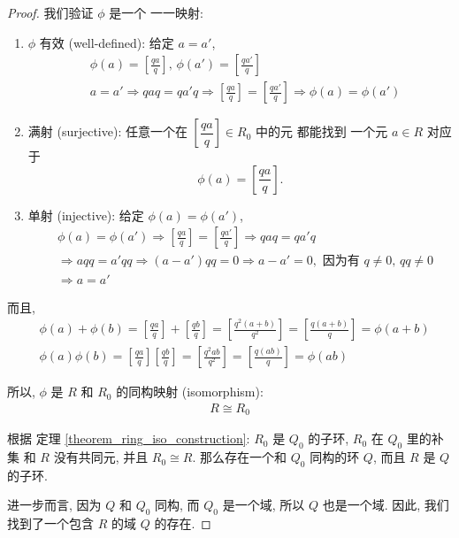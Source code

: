 \documentclass[utf8]{ctexbook}
\theoremstyle{definition}
\begin{document}
\begin{proof}
我们验证 $\phi$ 是一个 一一映射:
\begin{enumerate}
\item{$\phi$ 有效 (well-defined): 给定 $a = a'$,
\begin{align*}
& \phi(a) = \left[ \frac{q a}{q} \right], \, \phi(a') = \left[ \frac{q a'}{q} \right] \\
& a = a' \Longrightarrow q a q = q a' q \Longrightarrow \left[ \frac{q a}{q} \right] = \left[ \frac{q a'}{q} \right] \Longrightarrow \phi(a) = \phi(a')
\end{align*}
}
\item{满射 (surjective): 任意一个在 $\left[ \dfrac{q a}{q} \right] \in R_0$ 中的元 都能找到 一个元 $a \in R$ 对应于 
$$\phi(a) = \left[ \frac{q a}{q} \right] .$$}
\item{单射 (injective): 给定 $\phi(a) = \phi(a') $, 
\begin{align*}
& \phi(a) = \phi(a') \Longrightarrow \left[ \frac{q a}{q} \right] = \left[ \frac{q a'}{q} \right] \Longrightarrow q a q = q a' q \\
& \Longrightarrow a q q = a' q q \Longrightarrow (a - a') q q = 0 \Longrightarrow a - a' = 0, \mbox{ 因为有 } q \neq 0, \, q q \neq 0 \\
& \Longrightarrow a = a' 
\end{align*}
}
\end{enumerate}

而且,
\begin{align*}
& \phi(a) + \phi(b) = \left[ \frac{q a}{q} \right] + \left[ \frac{q b}{q} \right] = \left[ \frac{q^2 (a + b)  }{q^2 } \right] = \left[ \frac{q (a + b)  }{q } \right] = \phi(a+b) \\
& \phi(a)  \phi(b) =  \left[ \frac{q a}{q} \right]  \left[ \frac{q b}{q} \right] = \left[ \frac{q^2 a b}{q^2} \right] = \left[ \frac{q (a b) }{q} \right] = \phi(ab)
\end{align*}

所以, $\phi$ 是 $R$ 和 $R_0$ 的同构映射 (isomorphism):
\begin{align*}
R \cong R_0
\end{align*}

根据 定理 \ref{theorem_ring_iso_construction}: $R_0$ 是 $Q_0$ 的子环, $R_0$ 在 $Q_0$ 里的补集 和 $R$ 没有共同元, 并且 $R_0 \cong R$. 那么存在一个和 $Q_0$ 同构的环 $Q$, 而且 $R$ 是 $Q$ 的子环. 

进一步而言, 因为 $Q$ 和 $Q_0$ 同构, 而 $Q_0$ 是一个域, 所以 $Q$ 也是一个域. 因此, 我们找到了一个包含 $R$ 的域 $Q$ 的存在.

\end{proof}
\end{document}
